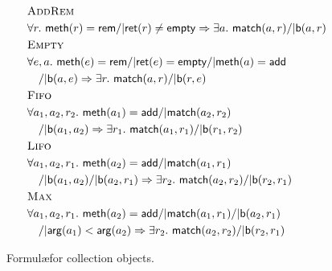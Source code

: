 \begin{figure}
  \footnotesize
  \begin{align*}
    & \textsc{AddRem} \\
    & \forall r.\ {\sf meth}(r) = {\sf rem} /| {\sf ret}(r) \neq {\sf empty} =>
      \exists a.\ {\sf match}(a,r) /| {\sf b}(a,r)
    \\
    & \textsc{Empty} \\
    & \forall e, a.\ {\sf meth}(e) = {\sf rem} /| {\sf ret}(e) = {\sf empty} /| {\sf meth}(a) = {\sf add} \\
    & \quad /| {\sf b}(a,e) => \exists r.\ {\sf match}(a,r) /| {\sf b}(r,e)
    \\
    & \textsc{Fifo} \\
    & \forall a_1, a_2, r_2.\ {\sf meth}(a_1) = {\sf add} /| {\sf match}(a_2,r_2) \\
    & \quad /| {\sf b}(a_1,a_2) =>\exists r_1.\ {\sf match}(a_1,r_1) /| {\sf b}(r_1,r_2)
    \\
    & \textsc{Lifo} \\
    & \forall a_1, a_2, r_1.\ {\sf meth}(a_2) = {\sf add} /| {\sf match}(a_1,r_1) \\
    & \quad /| {\sf b}(a_1,a_2) /| {\sf b}(a_2,r_1) => \exists r_2.\ {\sf match}(a_2,r_2) /| {\sf b}(r_2,r_1)
    \\
    & \textsc{Max} \\
    & \forall a_1, a_2, r_1.\ {\sf meth}(a_2) = {\sf add} /| {\sf match}(a_1,r_1) /| {\sf b}(a_2,r_1) \\
    & \quad /| {\sf arg}(a_1) < {\sf arg}(a_2) => \exists r_2.\ {\sf match}(a_2,r_2) /| {\sf b}(r_2,r_1)
  \end{align*}
  \caption{Formul\ae for collection objects.}
  \label{fig:formulas:collecions}
\end{figure}

%
%

